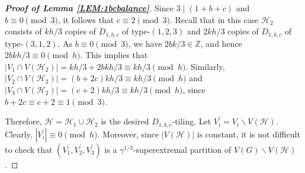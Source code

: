 \documentclass[10pt,a4paper]{amsart}
\begin{document}
\begin{proof}[\textbf{Proof of Lemma \ref{LEM:1bcbalance}}]
Since $3\mid(1+b+c)$ and $b\equiv0\pmod{3}$, it follows that $c\equiv2\pmod3$. Recall that in this case $\mathcal{H}_2$ consists of $kh/3$ copies of $D_{1,b,c}$ of type-$(1,2,3)$ and $2kh/3$ copies of $D_{1,b,c}$ of type-$(3,1,2)$. As $b\equiv0\pmod{3}$, we have $2bk/3\in\mathbb{Z}$, and hence $2bkh/3\equiv0\pmod h$. This implies that $
|V_1\cap V(\mathcal{H}_2)|=kh/3+2bkh/3\equiv kh/3\pmod h$. 
Similarly, $|V_2\cap V(\mathcal{H}_2)|=(b+2c)kh/3\equiv kh/3\pmod{h}$ 
and $|V_3\cap V(\mathcal{H}_2)|=(c+2)kh/3\equiv kh/3\pmod{h}$, 
since $b+2c\equiv c+2\equiv1\pmod3$. 

Therefore, $\mathcal{H}=\mathcal{H}_1\cup\mathcal{H}_2$ is the desired $D_{1,b,c}$-tiling. Let $V_i^\prime=V_i\backslash V(\mathcal{H})$. Clearly, $|V_i^\prime|\equiv0 \pmod h$. Moreover, since $|V(\mathcal{H})|$ is constant, it is not difficult to check that $(V_1^\prime,V_2^\prime,V_3^\prime)$ is a $\gamma^{1/3}$-superextremal partition of $V(G)\backslash V(\mathcal{H})$.
\end{proof}
\end{document}
